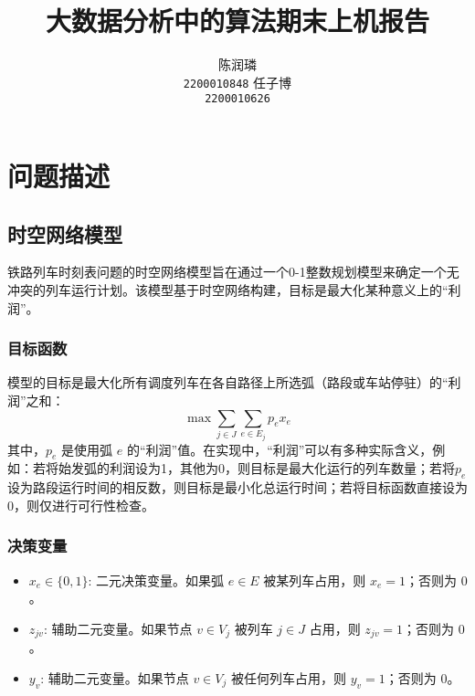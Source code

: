 \documentclass{article}
\title{大数据分析中的算法期末上机报告}
\author{%
    \large 陈润璘 \\
    \large \texttt{2200010848}
    \And
    \large 任子博 \\
    \large \texttt{2200010626}
}
\begin{document}
    \maketitle


    \section{问题描述}

    \subsection{时空网络模型}\label{subsec:spatial-temporal-network-model}

    铁路列车时刻表问题的时空网络模型旨在通过一个0-1整数规划模型来确定一个无冲突的列车运行计划。该模型基于时空网络构建，目标是最大化某种意义上的“利润”。

    \subsubsection{目标函数}
    模型的目标是最大化所有调度列车在各自路径上所选弧（路段或车站停驻）的“利润”之和：
    \begin{equation}
        \max \sum_{j \in J} \sum_{e \in E_j} p_e x_e\label{eq:obj}
    \end{equation}
    其中，$p_e$ 是使用弧 $e$
    的“利润”值。在实现中，“利润”可以有多种实际含义，例如：若将始发弧的利润设为1，其他为0，则目标是最大化运行的列车数量；若将$p_e$设为路段运行时间的相反数，则目标是最小化总运行时间；若将目标函数直接设为0，则仅进行可行性检查。

    \subsubsection{决策变量}
    \begin{itemize}
        \item $x_e \in \{0,1\}$: 二元决策变量。如果弧 $e \in E$ 被某列车占用，则 $x_e = 1$；否则为 $0$。
        \item $z_{jv}$: 辅助二元变量。如果节点 $v \in V_j$ 被列车 $j \in J$ 占用，则
        $z_{jv} = 1$；否则为 $0$。
        \item $y_v$: 辅助二元变量。如果节点 $v \in V_j$ 被任何列车占用，则 $y_v = 1$；否则为 $0$。
    \end{itemize}
\end{document}
